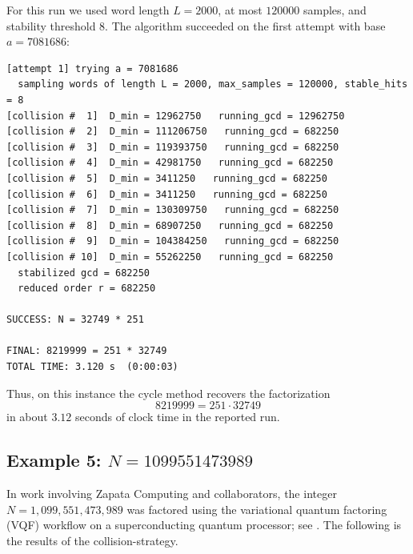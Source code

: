 \documentclass[11pt,reqno]{article}
\numberwithin{equation}{section}
\theoremstyle{plain}
\theoremstyle{definition}
\theoremstyle{remark}
\begin{document}
For this run we used word length $L=2000$, at most $120000$ samples, and stability threshold $8$.
The algorithm succeeded on the first attempt with base $a=7081686$:

\begin{verbatim}
[attempt 1] trying a = 7081686
  sampling words of length L = 2000, max_samples = 120000, stable_hits = 8
[collision #  1]  D_min = 12962750   running_gcd = 12962750
[collision #  2]  D_min = 111206750   running_gcd = 682250
[collision #  3]  D_min = 119393750   running_gcd = 682250
[collision #  4]  D_min = 42981750   running_gcd = 682250
[collision #  5]  D_min = 3411250   running_gcd = 682250
[collision #  6]  D_min = 3411250   running_gcd = 682250
[collision #  7]  D_min = 130309750   running_gcd = 682250
[collision #  8]  D_min = 68907250   running_gcd = 682250
[collision #  9]  D_min = 104384250   running_gcd = 682250
[collision # 10]  D_min = 55262250   running_gcd = 682250
  stabilized gcd = 682250
  reduced order r = 682250

SUCCESS: N = 32749 * 251

FINAL: 8219999 = 251 * 32749
TOTAL TIME: 3.120 s  (0:00:03)
\end{verbatim}

Thus, on this instance the cycle method recovers the factorization
\[
8219999 = 251\cdot 32749
\]
in about $3.12$ seconds of clock time in the reported run.

\subsection{Example 5: $N=1099551473989$}
In work involving Zapata Computing and collaborators, the integer \(N=1{,}099{,}551{,}473{,}989\) was factored using the variational
quantum factoring (VQF) workflow on a superconducting quantum processor; see \cite{Karamlou2021VQF}.  The following is the results
of the collision-strategy.
\end{document}
